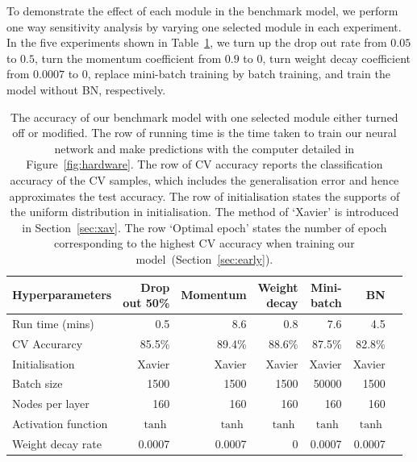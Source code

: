 To demonstrate the effect of each module in the benchmark model, we perform one way sensitivity analysis by varying one selected module in each experiment. 
In the five experiments shown in Table~\ref{tb:comp}, we turn up the drop out rate from $0.05$ to $0.5$, turn the momentum coefficient from $0.9$ to $0$, turn weight decay coefficient from $0.0007$ to $0$, replace mini-batch training by batch training, and train the model without BN, respectively.
\begin{table}
\caption{The accuracy of our benchmark model with one selected module either turned off or modified. The row of running time is the time taken to train our neural network and make predictions with the computer detailed in Figure~\ref{fig:hardware}. The row of CV accuracy reports the classification accuracy of the CV samples, which includes the generalisation error and hence approximates the test accuracy. The row of initialisation states the supports of the uniform distribution in initialisation. The method of `Xavier' is introduced in Section~\ref{sec:xav}. The row `Optimal epoch' states the number of epoch corresponding to the highest CV accuracy when training our model~(Section~\ref{sec:early}).
\label{tb:comp}}
\centering
{\centering
\begin{tabular}{@{}lrrrrrr@{}}
\toprule
Hyperparameters             & {\parbox[t]{1.4cm}{\raggedleft Drop \\out 50\%}  } 
& Momentum & {\parbox[t]{1.3cm}{\raggedleft Weight \\decay}} & {\parbox[t]{1.3cm}{\raggedleft Mini-\\batch}} & BN \\ \midrule
Run time (mins)             & 0.5        & 8.6          & 0.8      & 7.6 & 4.5          \\
CV Accurarcy                   & 85.5\%     & 89.4\%       & 88.6\%   & 87.5\% &82.8\%       \\ \midrule
Initialisation              & Xavier     & Xavier       & Xavier   & Xavier & Xavier        \\
Batch size                   & 1500       & 1500         & 1500     & 50000    & 1500        \\
Nodes per layer        & 160        & 160          & 160      & 160    & 160         \\
Activation function        & $\tanh$    & $\tanh$      & $\tanh$  & $\tanh$  & $\tanh$       \\
Weight decay rate          & 0.0007     & 0.0007       & 0        & 0.0007  & 0.0007        \\

\end{tabular}}
\end{table}
